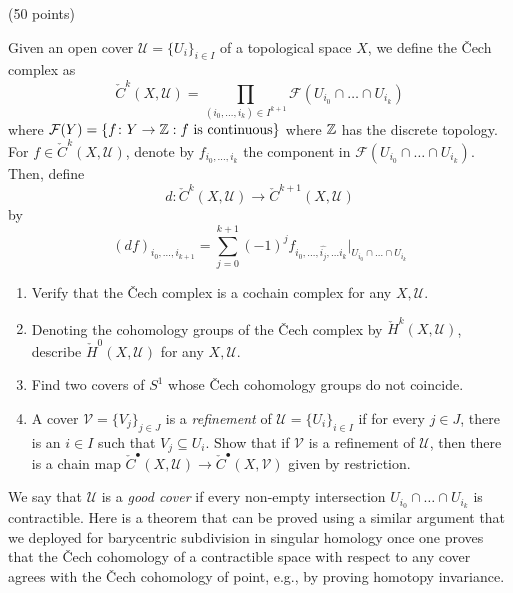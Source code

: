 \documentclass[12pt]{article}
\begin{document}
\begin{problem}{4}(50 points) 
    \begin{defn}
        Given an open cover $\mathcal{U} = \{ U_i \}_{i \in I}$ of a topological space $X$, we define the \v{C}ech complex as
        \[ \check{C}^k(X, \mathcal{U}) = \prod_{(i_0, \hdots, i_k) \in I^{k+1}} \mathcal{F}(U_{i_0} \cap \hdots \cap U_{i_k}) \]
        where $\mathcal{F}(Y) = \{ f \colon Y \to \mathbb Z : f \text{ is continuous}\}$ where $\mathbb Z$ has the discrete topology. For $f \in \check{C}^k(X, \mathcal{U})$, denote by $f_{i_0, \hdots, i_k}$ the component in $\mathcal{F}(U_{i_0} \cap \hdots \cap U_{i_k})$. Then, define 
        \[ d \colon \check{C}^k(X, \mathcal{U}) \to \check{C}^{k+1} (X, \mathcal{U}) \]
        by
        \[ (df)_{i_0, \hdots, i_{k+1}} = \sum_{j=0}^{k+1} (-1)^j f_{i_0, \hdots, \hat{i_j}, \hdots i_k}|_{U_{i_0} \cap \hdots \cap U_{i_k}} \]
    \end{defn}
    \begin{enumerate}
    
    \item Verify that the \v{C}ech complex is a cochain complex for any $X, \mathcal{U}$. 

    \item Denoting the cohomology groups of the \v{C}ech complex by $\check{H}^k(X, \mathcal{U})$, describe $\check{H}^0(X, \mathcal{U})$ for any $X, \mathcal{U}$.

    \item Find two covers of $S^1$ whose \v{C}ech cohomology groups do not coincide. 

    \item A cover $\mathcal{V} = \{V_j\}_{j \in J}$ is a \emph{refinement} of $\mathcal{U} = \{ U_i \}_{i \in I}$ if for every $j \in J$, there is an $i \in I$ such that $V_j \subseteq U_i$. Show that if $\mathcal{V}$ is a refinement of $\mathcal{U}$, then there is a chain map $\check{C}^\bullet (X, \mathcal{U} ) \to \check{C}^\bullet (X, \mathcal{V})$ given by restriction. 
    \end{enumerate}

    We say that $\mathcal{U}$ is a \emph{good cover} if every non-empty intersection $U_{i_0} \cap \hdots \cap U_{i_k}$ is contractible. Here is a theorem that can be proved using a similar argument that we deployed for barycentric subdivision in singular homology once one proves that the \v{C}ech cohomology of a contractible space with respect to any cover agrees with the \v{C}ech cohomology of point, e.g., by proving homotopy invariance.


\end{problem}
\end{document}
